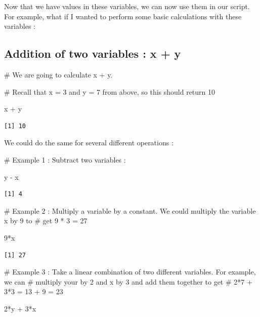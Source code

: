 \documentclass[
  letterpaper,
  DIV=11,
  numbers=noendperiod]{scrreprt}
\newenvironment{Shaded}{\begin{snugshade}}{\end{snugshade}}
\newcommand{\CommentTok}[1]{\textcolor[rgb]{0.37,0.37,0.37}{#1}}
\newcommand{\DecValTok}[1]{\textcolor[rgb]{0.68,0.00,0.00}{#1}}
\newcommand{\NormalTok}[1]{\textcolor[rgb]{0.00,0.23,0.31}{#1}}
\newcommand{\SpecialCharTok}[1]{\textcolor[rgb]{0.37,0.37,0.37}{#1}}
\begin{document}
Now that we have values in these variables, we can now use them in our
script. For example, what if I wanted to perform some basic calculations
with these variables :

\subsection*{Addition of two variables : x +
y}\label{addition-of-two-variables-x-y}

\begin{Shaded}
\begin{Highlighting}[]
\CommentTok{\# We are going to calculate x + y. }

\CommentTok{\# Recall that x = 3 and y = 7 from above, so this should return 10}

\NormalTok{x }\SpecialCharTok{+}\NormalTok{ y}
\end{Highlighting}
\end{Shaded}

\begin{verbatim}
[1] 10
\end{verbatim}

We could do the same for several different operations :

\begin{Shaded}
\begin{Highlighting}[]
\CommentTok{\# Example 1 : Subtract two variables :}

\NormalTok{y }\SpecialCharTok{{-}}\NormalTok{ x}
\end{Highlighting}
\end{Shaded}

\begin{verbatim}
[1] 4
\end{verbatim}

\begin{Shaded}
\begin{Highlighting}[]
\CommentTok{\# Example 2 : Multiply a variable by a constant. We could multiply the variable x by 9 to}
\CommentTok{\# get 9 * 3 = 27}

\DecValTok{9}\SpecialCharTok{*}\NormalTok{x}
\end{Highlighting}
\end{Shaded}

\begin{verbatim}
[1] 27
\end{verbatim}

\begin{Shaded}
\begin{Highlighting}[]
\CommentTok{\# Example 3 : Take a linear combination of two different variables. For example, we can}
\CommentTok{\# multiply your by 2 and x by 3 and add them together to get }
\CommentTok{\# 2*7 + 3*3 = 13 + 9 = 23 }

\DecValTok{2}\SpecialCharTok{*}\NormalTok{y }\SpecialCharTok{+} \DecValTok{3}\SpecialCharTok{*}\NormalTok{x}
\end{Highlighting}
\end{Shaded}
\end{document}
